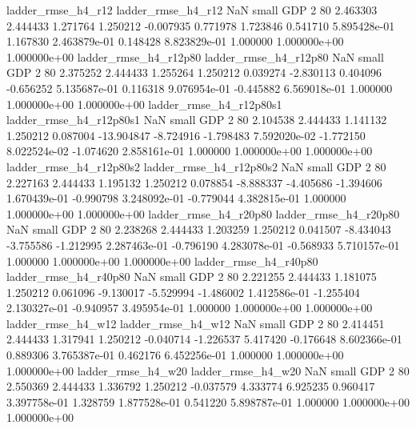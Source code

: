       ladder_rmse_h4_r12       ladder_rmse_h4_r12                   NaN      small      GDP                 2 80 2.463303       2.444433 1.271764       1.250212   -0.007935      0.771978      1.723846     0.541710   5.895428e-01  1.167830 2.463879e-01     0.148428   8.823829e-01            1.000000    1.000000e+00        1.000000e+00
   ladder_rmse_h4_r12p80    ladder_rmse_h4_r12p80                   NaN      small      GDP                 2 80 2.375252       2.444433 1.255264       1.250212    0.039274     -2.830113      0.404096    -0.656252   5.135687e-01  0.116318 9.076954e-01    -0.445882   6.569018e-01            1.000000    1.000000e+00        1.000000e+00
 ladder_rmse_h4_r12p80s1  ladder_rmse_h4_r12p80s1                   NaN      small      GDP                 2 80 2.104538       2.444433 1.141132       1.250212    0.087004    -13.904847     -8.724916    -1.798483   7.592020e-02 -1.772150 8.022524e-02    -1.074620   2.858161e-01            1.000000    1.000000e+00        1.000000e+00
 ladder_rmse_h4_r12p80s2  ladder_rmse_h4_r12p80s2                   NaN      small      GDP                 2 80 2.227163       2.444433 1.195132       1.250212    0.078854     -8.888337     -4.405686    -1.394606   1.670439e-01 -0.990798 3.248092e-01    -0.779044   4.382815e-01            1.000000    1.000000e+00        1.000000e+00
   ladder_rmse_h4_r20p80    ladder_rmse_h4_r20p80                   NaN      small      GDP                 2 80 2.238268       2.444433 1.203259       1.250212    0.041507     -8.434043     -3.755586    -1.212995   2.287463e-01 -0.796190 4.283078e-01    -0.568933   5.710157e-01            1.000000    1.000000e+00        1.000000e+00
   ladder_rmse_h4_r40p80    ladder_rmse_h4_r40p80                   NaN      small      GDP                 2 80 2.221255       2.444433 1.181075       1.250212    0.061096     -9.130017     -5.529994    -1.486002   1.412586e-01 -1.255404 2.130327e-01    -0.940957   3.495954e-01            1.000000    1.000000e+00        1.000000e+00
      ladder_rmse_h4_w12       ladder_rmse_h4_w12                   NaN      small      GDP                 2 80 2.414451       2.444433 1.317941       1.250212   -0.040714     -1.226537      5.417420    -0.176648   8.602366e-01  0.889306 3.765387e-01     0.462176   6.452256e-01            1.000000    1.000000e+00        1.000000e+00
      ladder_rmse_h4_w20       ladder_rmse_h4_w20                   NaN      small      GDP                 2 80 2.550369       2.444433 1.336792       1.250212   -0.037579      4.333774      6.925235     0.960417   3.397758e-01  1.328759 1.877528e-01     0.541220   5.898787e-01            1.000000    1.000000e+00        1.000000e+00
